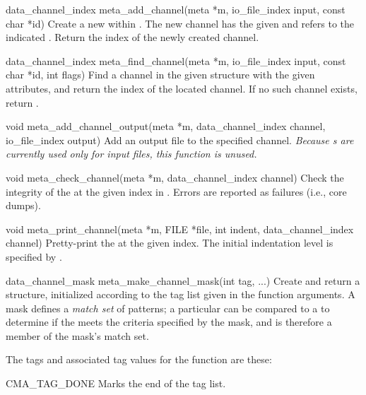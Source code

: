 \begin{cprototypelist}
  \item[data_channel_index meta_add_channel(meta *m, io_file_index input,
                                            const char *id)]
  Create a new  within .  The new channel
  has the given  and refers to the indicated .
  Return the index of the newly created channel.

  \item[data_channel_index meta_find_channel(meta *m, io_file_index input,
                                             const char *id, int flags)]
  Find a channel in the given  structure with the given
  attributes, and return the index of the located channel.  If no such channel
  exists, return .

  \item[void meta_add_channel_output(meta *m, data_channel_index channel,
                                     io_file_index output)]
  Add an output file to the specified channel.  \emph{Because s
  are currently used only for input files, this function is unused.}

  \item[void meta_check_channel(meta *m, data_channel_index channel)]
  Check the integrity of the  at the given index in
  .  Errors are reported as  failures (i.e., core
  dumps).

  \item[void meta_print_channel(meta *m, FILE *file, int indent,
                                data_channel_index channel)]
  Pretty-print the  at the given index.  The initial
  indentation level is specified by .

  \item[data_channel_mask meta_make_channel_mask(int tag, ...)]
  Create and return a  structure, initialized according to
  the tag list given in the function arguments.  A mask defines a \emph{match
  set} of  patterns; a particular  can
  be compared to a  to determine if the
   meets the criteria specified by the mask, and is
  therefore a member of the mask's match set.

  The tags and associated tag values for the 
  function are these:
  \begin{cidentifierlist}
    \item[CMA_TAG_DONE]
    \tagtypenull{} Marks the end of the tag list.


\end{cidentifierlist}
\end{cprototypelist}
